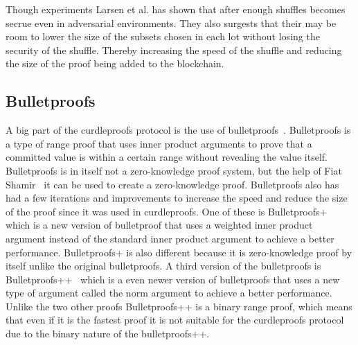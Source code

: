 Though experiments Larsen et al. has shown that after enough shuffles becomes secrue even in adversarial environments.
They also surgests that their may be room to lower the size of the subsets chosen in each lot without losing the security of the shuffle.
Thereby increasing the speed of the shuffle and reducing the size of the proof being added to the blockchain.

\subsection{Bulletproofs}\label{sec:related-work-bulletproofs}
A big part of the curdleproofs protocol is the use of bulletproofs~\cite{bunz2018bulletproofs}.
Bulletproofs is a type of range proof that uses inner product arguments to prove that a committed value is within a certain range without revealing the value itself.
Bulletproofs is in itself not a zero-knowledge proof system, but the help of Fiat Shamir~\cite{bunz2018bulletproofs} it can be used to create a zero-knowledge proof.
Bulletproofs also has had a few iterations and improvements to increase the speed and reduce the size of the proof since it was used in curdleproofs.
One of these is Bulletproofs+~\cite{chung2022bulletproofs+} which is a new version of bulletproof that uses a weighted inner product argument instead of the standard inner product argument to achieve a better performance.
Bulletproofs+ is also different because it is zero-knowledge proof by itself unlike the original bulletproofs.
A third version of the bulletproofs is Bulletproofs++~\cite{eagen2024bulletproofs++} which is a even newer version of bulletproofs that uses a new type of argument called the norm argument to achieve a better performance.
Unlike the two other proofs Bulletproofs++ is a binary range proof, which means that even if it is the fastest proof it is not suitable for the curdleproofs protocol due to the binary nature of the bulletproofs++.